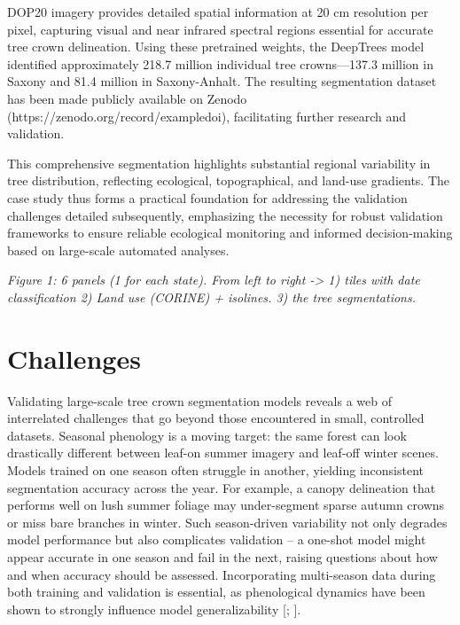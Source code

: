 \documentclass[runningheads]{llncs}
\begin{document}
DOP20 imagery provides detailed spatial information at 20 cm resolution
per pixel, capturing visual and near infrared spectral regions essential
for accurate tree crown delineation. Using these pretrained weights, the
DeepTrees model identified approximately 218.7 million individual tree
crowns---137.3 million in Saxony and 81.4 million in Saxony-Anhalt. The
resulting segmentation dataset has been made publicly available on
Zenodo (https://zenodo.org/record/exampledoi), facilitating further
research and validation.

This comprehensive segmentation highlights substantial regional
variability in tree distribution, reflecting ecological, topographical,
and land-use gradients. The case study thus forms a practical foundation
for addressing the validation challenges detailed subsequently,
emphasizing the necessity for robust validation frameworks to ensure
reliable ecological monitoring and informed decision-making based on
large-scale automated analyses.

\emph{Figure 1: 6 panels (1 for each state). From left to right
-\textgreater{} 1) tiles with date classification 2) Land use (CORINE) +
isolines. 3) the tree segmentations.}

\section{Challenges}\label{challenges}

Validating large-scale tree crown segmentation models reveals a web of
interrelated challenges that go beyond those encountered in small,
controlled datasets. Seasonal phenology is a moving target: the same
forest can look drastically different between leaf-on summer imagery and
leaf-off winter scenes. Models trained on one season often struggle in
another, yielding inconsistent segmentation accuracy across the year.
For example, a canopy delineation that performs well on lush summer
foliage may under-segment sparse autumn crowns or miss bare branches in
winter. Such season-driven variability not only degrades model
performance but also complicates validation -- a one-shot model might
appear accurate in one season and fail in the next, raising questions
about how and when accuracy should be assessed. Incorporating
multi-season data during both training and validation is essential, as
phenological dynamics have been shown to strongly influence model
generalizability {[}\cite{moussaid2021tree}; \cite{cong2022citrus}{]}.
\end{document}
